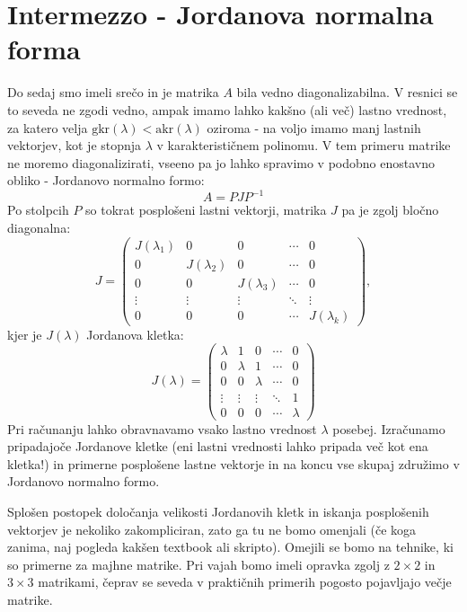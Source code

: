 \documentclass{article}
\begin{document}
\section*{Intermezzo - Jordanova normalna forma}
Do sedaj smo imeli srečo in je matrika $A$ bila vedno diagonalizabilna. V resnici se to seveda ne zgodi vedno, ampak imamo lahko kakšno (ali več) lastno vrednost, za katero velja $\mathrm{gkr}(\lambda) < \mathrm{akr}(\lambda)$ oziroma - na voljo imamo manj lastnih vektorjev, kot je stopnja $\lambda$ v karakterističnem polinomu. V tem primeru matrike ne moremo diagonalizirati, vseeno pa jo lahko spravimo v podobno enostavno obliko - Jordanovo normalno formo:
\begin{equation*}
A = P J P^{-1}
\end{equation*}
Po stolpcih $P$ so tokrat posplošeni lastni vektorji, matrika $J$ pa je zgolj bločno diagonalna:
\begin{equation*}
J =  
\begin{pmatrix}
    J(\lambda_1) & 0 & 0 & \cdots & 0 \\
    0 & J(\lambda_2) & 0 & \cdots & 0 \\
    0 & 0 & J(\lambda_3) & \cdots & 0 \\
    \vdots & \vdots & \vdots & \ddots & \vdots \\
    0 & 0 & 0 & \cdots & J(\lambda_k)
\end{pmatrix},
\end{equation*}
kjer je $J(\lambda)$ Jordanova kletka:
\begin{equation*}
J(\lambda) = 
\begin{pmatrix}
    \lambda & 1      & 0      & \cdots & 0 \\
    0      & \lambda & 1      & \cdots & 0 \\
    0      & 0      & \lambda & \cdots & 0 \\
    \vdots & \vdots & \vdots & \ddots & 1 \\
    0      & 0      & 0      & \cdots & \lambda
\end{pmatrix}
\end{equation*}
Pri računanju lahko obravnavamo vsako lastno vrednost $\lambda$ posebej. Izračunamo pripadajoče Jordanove kletke (eni lastni vrednosti lahko pripada več kot ena kletka!) in primerne posplošene lastne vektorje in na koncu vse skupaj združimo v Jordanovo normalno formo.

Splošen postopek določanja velikosti Jordanovih kletk in iskanja posplošenih vektorjev je nekoliko zakompliciran, zato ga tu ne bomo omenjali (če koga zanima, naj pogleda kakšen textbook ali skripto). Omejili se bomo na tehnike, ki so primerne za majhne matrike. Pri vajah bomo imeli opravka zgolj z $2 \times 2$ in $3 \times 3$ matrikami, čeprav se seveda v praktičnih primerih pogosto pojavljajo večje matrike.
\end{document}
